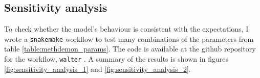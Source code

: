 \subsection{Sensitivity analysis}
To check whether the model's behaviour is consistent with the expectations, I
wrote a \texttt{snakemake} workflow to test many combinations of the parameters
from table \ref{table:methdemon_params}. The code is available at the github
repository for the workflow, \texttt{walter} \cite{walter}. A summary of the
results is shown in figures \ref{fig:sensitivity_analysis_1} and
\ref{fig:sensitivity_analysis_2}.

